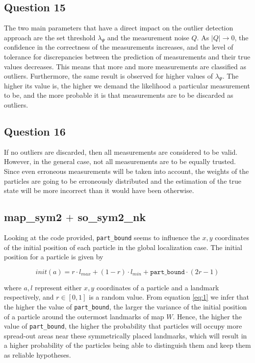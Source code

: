 \subsection{Question 15}

The two main parameters that have a direct impact on the outlier detection approach are the set threshold $\lambda_{\Psi}$ and the 
measurement noise $Q$. As $|Q| \rightarrow 0$, the confidence in the correctness of the measurements increases, and the level of tolerance for discrepancies
between the prediction of measurements and their true values decreases. This means that more and more measurements are classified as outliers. Furthermore, the same 
result is observed for higher values of $\lambda_{\Psi}$. The higher its value is, the higher we demand the likelihood a particular measurement to be, and the more
probable it is that measurements are to be discarded as outliers.

\subsection{Question 16}

If no outliers are discarded, then all measurements are considered to be valid. However, in the general case, not all measurements are to be equally trusted.
Since even erroneous measurements will be taken into account, the weights of the particles are going to be erroneously distributed and the estimation of the
true state will be more incorrect than it would have been otherwise.

\subsection{map\_sym2 $+$ so\_sym2\_nk}

Looking at the code provided, \texttt{part\_bound} seems to influence the $x,y$ coordinates of the initial position of each particle in the global localization case.
The initial position for a particle is given by

\begin{equation}
init(a) = r \cdot l_{max} + (1-r) \cdot l_{min} + \texttt{part\_bound} \cdot (2r-1)
\label{eq:1}
\end{equation}

where $a,l$ represent either $x,y$ coordinates of a particle and a landmark respectively, and $r \in [0,1]$ is a random value. 
From equation \ref{eq:1} we infer that the higher the value of \texttt{part\_bound}, the larger the variance of the initial position of a particle around 
the outermost landmarks of map $W$. Hence, the higher the value of \texttt{part\_bound}, the higher the probability that particles will occupy more spread-out areas
near these symmetrically placed landmarks, which will result in a higher probability of the particles being able to distinguish them and keep them as
reliable hypotheses.


